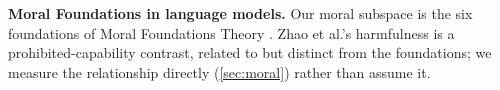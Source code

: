 \textbf{Moral Foundations in language models.} Our moral subspace is the six foundations
of Moral Foundations Theory \citep{graham2013mft}. Zhao et al.'s harmfulness is a
prohibited-capability contrast, related to but distinct from the foundations; we
measure the relationship directly (\autoref{sec:moral}) rather than assume it.
